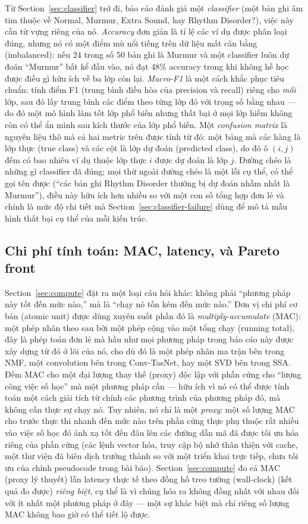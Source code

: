 \documentclass[11pt]{article}
\begin{document}
Từ Section~\ref{sec:classifier} trở đi, báo cáo đánh giá một
\emph{classifier} (một bản ghi âm tim thuộc về Normal, Murmur, Extra
Sound, hay Rhythm Disorder?), việc này cần từ vựng riêng của nó.
\emph{Accuracy} đơn giản là tỉ lệ các ví dụ được phân loại đúng, nhưng nó
có một điểm mù nổi tiếng trên dữ liệu mất cân bằng (imbalanced): nếu 24
trong số 50 bản ghi là Murmur và một classifier luôn dự đoán ``Murmur''
bất kể đầu vào, nó đạt 48\% accuracy trong khi không hề học được điều gì
hữu ích về ba lớp còn lại. \emph{Macro-F1} là một cách khắc phục tiêu
chuẩn: tính điểm F1 (trung bình điều hòa của precision và recall) riêng
cho \emph{mỗi} lớp, sau đó lấy trung bình các điểm theo từng lớp đó với
trọng số bằng nhau --- do đó một mô hình làm tốt lớp phổ biến nhưng thất
bại ở mọi lớp hiếm không còn có thể ẩn mình sau kích thước của lớp phổ
biến. Một \emph{confusion matrix} là nguyên liệu thô mà cả hai metric
trên được tính từ đó: một bảng mà các hàng là lớp thực (true class) và
các cột là lớp dự đoán (predicted class), do đó ô $(i,j)$ đếm có bao
nhiêu ví dụ thuộc lớp thực $i$ được dự đoán là lớp $j$. Đường chéo là
những gì classifier đã đúng; mọi thứ ngoài đường chéo là một lỗi cụ thể,
có thể gọi tên được (``các bản ghi Rhythm Disorder thường bị dự đoán nhầm
nhất là
Murmur''), điều này hữu ích hơn nhiều so với một con số tổng hợp đơn lẻ và
chính là mức độ chi tiết mà Section~\ref{sec:classifier-failure} dùng để
mô tả mẫu hình thất bại cụ thể của mỗi kiến trúc.

\subsection{Chi phí tính toán: MAC, latency, và Pareto front}
\label{sec:bg-compute}

Section~\ref{sec:compute} đặt ra một loại câu hỏi khác: không phải ``phương
pháp này tốt đến mức nào,'' mà là ``chạy nó tốn kém đến mức nào.'' Đơn vị
chi phí cơ bản (atomic unit) được dùng xuyên suốt phần đó là
\emph{multiply-accumulate} (MAC): một phép nhân theo sau bởi một phép cộng
vào một tổng chạy (running total), đây là phép toán đơn lẻ mà hầu như mọi
phương pháp trong báo cáo này được xây dựng từ đó ở lõi của nó, cho dù đó
là một phép nhân ma trận bên trong NMF, một convolution bên trong
Conv-TasNet, hay một SVD bên trong SSA. Đếm MAC cho một đại lượng thay
thế (proxy) độc lập với phần cứng cho ``lượng công việc số học'' mà một
phương pháp cần --- hữu ích vì nó có thể được tính toán một cách giải tích
từ chính các phương trình của phương pháp đó, mà không cần thực sự chạy
nó. Tuy nhiên, nó chỉ là một \emph{proxy}: một số lượng MAC cho trước thực
thi nhanh đến mức nào trên phần cứng thực phụ thuộc rất nhiều vào việc số
học đó ánh xạ tốt đến đâu lên các đường dẫn mã đã được tối ưu hóa riêng
của phần cứng (các lệnh vector hóa, truy cập bộ nhớ thân thiện với cache,
một thư viện đã biên dịch trưởng thành so với một triển khai trực tiếp,
chưa tối ưu của chính pseudocode trong bài báo). Section~\ref{sec:compute}
đo cả MAC (proxy lý thuyết) lẫn latency thực tế theo đồng hồ treo tường
(wall-clock) (kết quả đo được) \emph{riêng biệt}, cụ thể là vì chúng hóa
ra không đồng nhất với nhau đối với ít nhất một phương pháp ở đây --- một
sự khác biệt mà chỉ riêng số lượng MAC không bao giờ có thể tiết lộ được.
\end{document}
